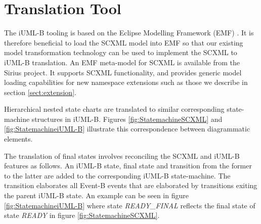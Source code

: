 
\section{Translation Tool}
\label{sec:translation}

The iUML-B tooling is based on the Eclipse Modelling Framework (EMF) \cite{steinberg2009emf}. 
It is therefore beneficial to load the SCXML model into EMF so that our existing model transformation technology can be used to 
implement the SCXML to iUML-B translation. 
An EMF meta-model for SCXML is available from the Sirius \cite{siriuswebsite} project. 
It supports SCXML functionality, and provides generic model
loading capabilities for new namespace extensions such as those we 
describe in section \ref{sect:extension}.

Hierarchical nested state charts are translated to similar corresponding  state-machine structures in iUML-B.  
Figures \ref{fig:StatemachineSCXML} and \ref{fig:StatemachineiUML-B} illustrate this correspondence between diagrammatic elements. 

The translation of final states involves reconciling the SCXML and iUML-B features as follows.
An iUML-B state, final state and transition from the former to the latter are added to the corresponding iUML-B state-machine. 
The transition elaborates all Event-B events that are elaborated by transitions exiting the parent iUML-B state. 
An example can be seen in figure \ref{fig:StatemachineiUML-B} where state \emph{READY\_FINAL} reflects the final state of state \emph{READY} in figure \ref{fig:StatemachineSCXML}.





